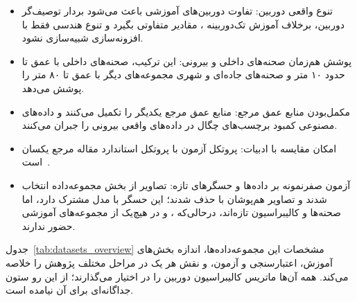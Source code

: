 \begin{itemize}
 \item تنوع واقعی دوربین: تفاوت دوربین‌های آموزشی باعث می‌شود بردار توصیف‌گر دوربین، برخلاف آموزش تک‌دوربینه ، مقادیر متفاوتی بگیرد و تنوع هندسی فقط با افزونه‌سازی شبیه‌سازی نشود.
 \item پوشش هم‌زمان صحنه‌های داخلی و بیرونی: این ترکیب، صحنه‌های داخلی  با عمق تا حدود ۱۰ متر و صحنه‌های جاده‌ای و شهری مجموعه‌های دیگر با عمق تا ۸۰ متر را پوشش می‌دهد.
 \item مکمل‌بودن منابع عمق مرجع: منابع عمق مرجع یکدیگر را تکمیل می‌کنند و داده‌های مصنوعی کمبود برچسب‌های چگال در داده‌های واقعی بیرونی را جبران می‌کنند.
 \item امکان مقایسه با ادبیات: پروتکل آزمون  با پروتکل استاندارد مقاله مرجع یکسان است~\cite{Eigen2014Depth,DepthAnythingV2}.
 \item آزمون صفرنمونه بر داده‌ها و حسگرهای تازه: تصاویر  از بخش  مجموعه‌داده  انتخاب شدند و تصاویر هم‌پوشان با  حذف شدند؛ این حسگر با  مدل مشترک دارد، اما صحنه‌ها و کالیبراسیون تازه‌اند، درحالی‌که ،  و  در هیچ‌یک از مجموعه‌های آموزشی حضور ندارند.
\end{itemize}

جدول~\ref{tab:datasets_overview} مشخصات این مجموعه‌داده‌ها، اندازه بخش‌های آموزش، اعتبارسنجی و آزمون، و نقش هر یک در
مراحل مختلف پژوهش را خلاصه می‌کند. همه آن‌ها ماتریس کالیبراسیون دوربین را در اختیار می‌گذارند؛ از این رو ستون جداگانه‌ای برای آن نیامده است.

